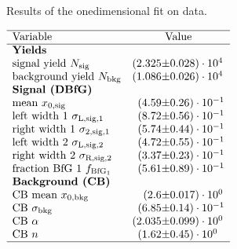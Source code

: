  
\begin{table}[tb]
    \centering
    \caption{Results of the onedimensional \logIP fit on data.}
    \label{tab:logIP_RS}
    $\begin{array}{lr@{\pm}l}
    \hline
    \text{Variable} & \multicolumn{2}{c}{\text{Value}} \\
    \hline
        \multicolumn{3}{l}{\text{\textbf{Yields}}} \\
\text{signal yield $N_\text{sig}$}&(2.325 & 0.028) \cdot 10^{4}\\
\text{background yield $N_\text{bkg}$}&(1.086 & 0.026) \cdot 10^{4}\\
\multicolumn{3}{l}{\text{\textbf{Signal (\DBfG)}}} \\
\text{mean $x_{0, \text{sig}}$}&(4.59 & 0.26) \cdot 10^{-1}\\
\text{left width 1 $\sigma_{\text{L,sig,1}}$}&(8.72 & 0.56) \cdot 10^{-1}\\
\text{right width 1 $\sigma_{\text{2,sig,1}}$}&(5.74 & 0.44) \cdot 10^{-1}\\
\text{left width 2 $\sigma_{\text{L,sig,2}}$}&(4.72 & 0.55) \cdot 10^{-1}\\
\text{right width 2 $\sigma_{\text{R,sig,2}}$}&(3.37 & 0.23) \cdot 10^{-1}\\
\text{fraction BfG 1 $f_{\BfG_1}$}&(5.61 & 0.89) \cdot 10^{-1}\\
\multicolumn{3}{l}{\text{\textbf{Background (\CB)}}} \\
\text{CB mean $x_{0, \text{bkg}}$}&(2.6 & 0.017) \cdot 10^{0}\\
\text{CB $\sigma_\text{bkg}$}&(6.85 & 0.14) \cdot 10^{-1}\\
\text{CB $\alpha$}&(2.035 & 0.099) \cdot 10^{0}\\
\text{CB $n$}&(1.62 & 0.45) \cdot 10^{0}\\

\hline
\end{array}$
\end{table}
    
